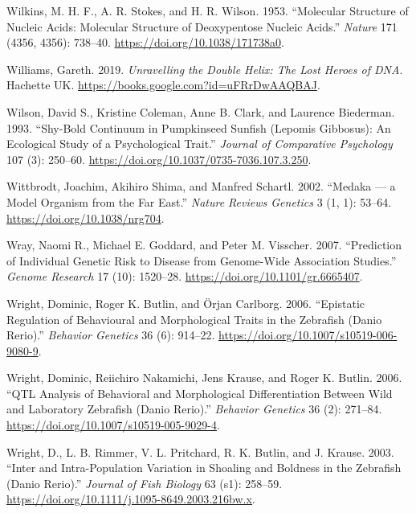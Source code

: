 \documentclass[
]{book}
\newlength{\cslhangindent}
\newlength{\cslentryspacingunit} %
\newenvironment{CSLReferences}[2] %
 {%
  \setlength{\parindent}{0pt}
  \ifodd #1
  \let\oldpar\par
  \def\par{\hangindent=\cslhangindent\oldpar}
  \fi
  \setlength{\parskip}{#2\cslentryspacingunit}
 }%
 {}
\begin{document}
\begin{CSLReferences}{1}{0}
\leavevmode{}%
Wilkins, M. H. F., A. R. Stokes, and H. R. Wilson. 1953. {``Molecular {Structure} of {Nucleic Acids}: {Molecular Structure} of {Deoxypentose Nucleic Acids}.''} \emph{Nature} 171 (4356, 4356): 738--40. \url{https://doi.org/10.1038/171738a0}.

\leavevmode{}%
Williams, Gareth. 2019. \emph{Unravelling the {Double Helix}: {The Lost Heroes} of {DNA}}. {Hachette UK}. \url{https://books.google.com?id=uFRrDwAAQBAJ}.

\leavevmode{}%
Wilson, David S., Kristine Coleman, Anne B. Clark, and Laurence Biederman. 1993. {``Shy-Bold Continuum in Pumpkinseed Sunfish ({Lepomis} Gibbosus): {An} Ecological Study of a Psychological Trait.''} \emph{Journal of Comparative Psychology} 107 (3): 250--60. \url{https://doi.org/10.1037/0735-7036.107.3.250}.

\leavevmode{}%
Wittbrodt, Joachim, Akihiro Shima, and Manfred Schartl. 2002. {``Medaka --- a Model Organism from the Far East.''} \emph{Nature Reviews Genetics} 3 (1, 1): 53--64. \url{https://doi.org/10.1038/nrg704}.

\leavevmode{}%
Wray, Naomi R., Michael E. Goddard, and Peter M. Visscher. 2007. {``Prediction of Individual Genetic Risk to Disease from Genome-Wide Association Studies.''} \emph{Genome Research} 17 (10): 1520--28. \url{https://doi.org/10.1101/gr.6665407}.

\leavevmode{}%
Wright, Dominic, Roger K. Butlin, and Örjan Carlborg. 2006. {``Epistatic Regulation of Behavioural and Morphological Traits in the Zebrafish ({Danio} Rerio).''} \emph{Behavior Genetics} 36 (6): 914--22. \url{https://doi.org/10.1007/s10519-006-9080-9}.

\leavevmode{}%
Wright, Dominic, Reiichiro Nakamichi, Jens Krause, and Roger K. Butlin. 2006. {``{QTL Analysis} of {Behavioral} and {Morphological Differentiation Between Wild} and {Laboratory Zebrafish} ({Danio} Rerio).''} \emph{Behavior Genetics} 36 (2): 271--84. \url{https://doi.org/10.1007/s10519-005-9029-4}.

\leavevmode{}%
Wright, D., L. B. Rimmer, V. L. Pritchard, R. K. Butlin, and J. Krause. 2003. {``Inter and Intra-Population Variation in Shoaling and Boldness in the Zebrafish ({Danio} Rerio).''} \emph{Journal of Fish Biology} 63 (s1): 258--59. \url{https://doi.org/10.1111/j.1095-8649.2003.216bw.x}.


\end{CSLReferences}
\end{document}
